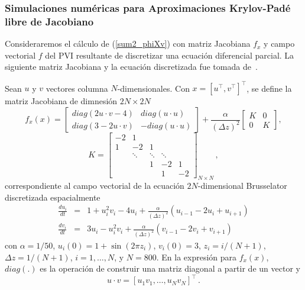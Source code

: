 \subsubsection{Simulaciones numéricas para Aproximaciones Krylov-Padé libre de Jacobiano}
Consideraremos el cálculo de (\ref{sum2_phiXv}) con matriz Jacobiana $f_x$ y campo vectorial $f$ del PVI resultante de discretizar una ecuación diferencial parcial. La siguiente matriz Jacobiana y la ecuación discretizada fue tomada de~\cite{tokman2006efficient}. 
\begin{example}
	\label{ej:ej1-hpfj} Sean $u$ y $v$ vectores columna $N$-dimensionales. Con $x=[u^{\intercal}, v^{\intercal}]^{\intercal}$, se define la matriz Jacobiana de dimnesión $2N\times2N$
	\begin{equation*}
	f_{x}(x)=\left[ 
	\begin{array}{cc}
	diag(2u\cdot v-4) & diag(u\cdot u) \\ 
	diag(3-2u\cdot v) & -diag(u\cdot u)%
	\end{array}%
	\right] +\frac{\alpha }{(\Delta z)^{2}}\left[ 
	\begin{array}{cc}
	K & 0 \\ 
	0 & K%
	\end{array}%
	\right] ,
	\end{equation*}
	\[
	K=\left[ 
	\begin{array}{ccccc}
	-2 & 1 &  &  & \\
	1 & -2 & 1 &  &  \\
	& \ddots  & \ddots  & \ddots  &  \\
	&  & 1 & -2 & 1 \\
	&  &  & 1 & -2%
	\end{array}%
	\right]_{N\times N} \, ,
	\]
	correspondiente al campo vectorial de la ecuación $2N$-dimensional Brusselator discretizada espacialmente
	\begin{eqnarray*}
		\frac{du_{i}}{dt} &=&1+u_{i}^{2}v_{i}-4u_{i}+\frac{\alpha }{(\Delta z)^{2}}%
		(u_{i-1}-2u_{i}+u_{i+1}) \\
		\frac{dv_{i}}{dt} &=&3u_{i}-u_{i}^{2}v_{i}+\frac{\alpha }{(\Delta z)^{2}}%
		(v_{i-1}-2v_{i}+v_{i+1})
	\end{eqnarray*}
	con $\alpha =1/50$, $u_{i}(0)=1+\sin (2\pi z_{i})$, $v_{i}(0)=3$, $z_{i}=i/(N+1)$, $\Delta z =1/(N+1)$, $i=1,\ldots,N$, y $N=800$. En la expresión para $f_x(x)$, $diag(.)$ es la operación de construir una matriz diagonal a partir de un vector y	
	\[  u \cdot v = [ u_1v_1, \ldots, u_Nv_N]^{\intercal}\, . \]
\end{example}

